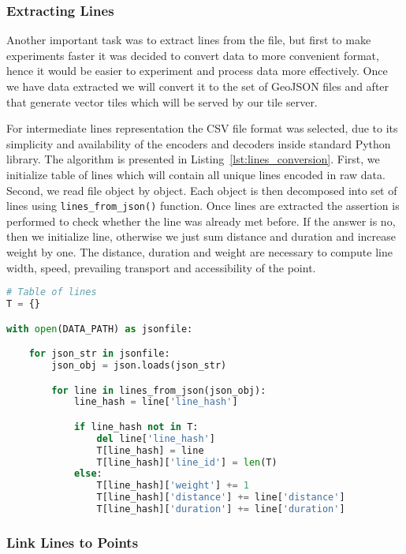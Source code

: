 \subsubsection{Extracting Lines}

Another important task was to extract lines from the file, but first to make experiments faster
it was decided to convert data to more convenient format, hence it would be easier to
experiment and process data more effectively. Once we have data extracted we will convert it
to the set of GeoJSON files and after that generate vector tiles which will be served by our
tile server.

For intermediate lines representation the CSV file format was selected, due to its simplicity
and availability of the encoders and decoders inside standard Python library. The algorithm is
presented in Listing~\ref{lst:lines_conversion}. First, we initialize table of lines which will
contain all unique lines encoded in raw data. Second, we read file object by object. Each object
is then decomposed into set of lines using \lstinline|lines_from_json()| function. Once lines are
extracted the assertion is performed to check whether the line was already met before. If the
answer is no, then we initialize line, otherwise we just sum distance and duration
and increase weight by one. The distance, duration and weight are necessary to compute
line width, speed, prevailing transport and accessibility of the point.


\begin{lstlisting}[language=python, caption=Lines conversion., label={lst:lines_conversion}]
# Table of lines
T = {}

with open(DATA_PATH) as jsonfile:

    for json_str in jsonfile:
        json_obj = json.loads(json_str)

        for line in lines_from_json(json_obj):
            line_hash = line['line_hash']

            if line_hash not in T:
                del line['line_hash']
                T[line_hash] = line
                T[line_hash]['line_id'] = len(T)
            else:
                T[line_hash]['weight'] += 1
                T[line_hash]['distance'] += line['distance']
                T[line_hash]['duration'] += line['duration']
\end{lstlisting}

\subsubsection{Link Lines to Points}


